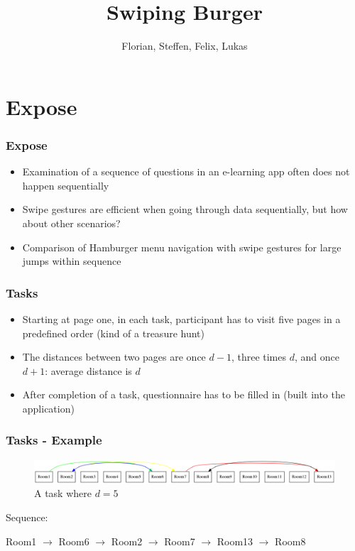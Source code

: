 \documentclass{beamer}
\begin{document}

\title{Swiping Burger}
\author{Florian, Steffen, Felix, Lukas}

\frame{\maketitle}

\section{Expose}
\begin{frame}
        \frametitle{Expose}
		\begin{itemize}
		  \item Examination of a sequence of questions in an e-learning app often does not happen sequentially
		  \item Swipe gestures are efficient when going through data sequentially, but how about other scenarios?
		  \item Comparison of Hamburger menu navigation with swipe gestures for large jumps within sequence
		\end{itemize}
\end{frame}

\begin{frame}
        \frametitle{Tasks}
		\begin{itemize}
		  \item Starting at page one, in each task, participant has to visit five pages in a predefined order (kind of a treasure hunt)
		  \item The distances between two pages are once $d - 1$, three times $d$, and once $d + 1$: average distance is $d$
		  \item After completion of a task, questionnaire has to be filled in (built into the application)
		\end{itemize}
\end{frame}

\begin{frame}
        \frametitle{Tasks - Example}


   		\begin{figure}
		\includegraphics[width=\textwidth]{distance_5.png}
		\caption{A task where $d = 5$}
		\end{figure}
		
		Sequence:
		
		Room1 $\rightarrow$ Room6 $\rightarrow$ Room2 $\rightarrow$ Room7 $\rightarrow$ Room13 $\rightarrow$ Room8

		
\end{frame}
\end{document}
